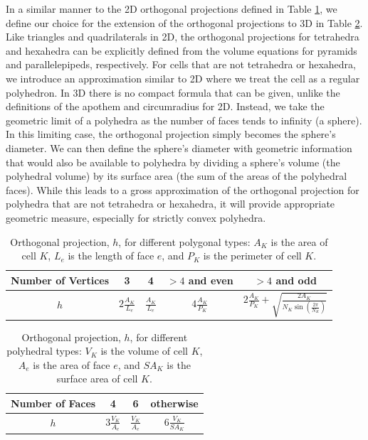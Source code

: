  In a similar manner to the 2D orthogonal projections defined in Table \ref{tab::orth_proj_2D}, we define our choice for the extension of the orthogonal projections to 3D in Table \ref{tab::orth_proj_3D}. Like triangles and quadrilaterals in 2D, the orthogonal projections for tetrahedra and hexahedra can be explicitly defined from the volume equations for pyramids and parallelepipeds, respectively. For cells that are not tetrahedra or hexahedra, we introduce an approximation similar to 2D where we treat the cell as a regular polyhedron. In 3D there is no compact formula that can be given, unlike the definitions of the apothem and circumradius for 2D. Instead, we take the geometric limit of a polyhedra as the number of faces tends to infinity (a sphere). In this limiting case, the orthogonal projection simply becomes the sphere's diameter. We can then define the sphere's diameter with geometric information that would also be available to polyhedra by dividing a sphere's volume (the polyhedral volume) by its surface area (the sum of the areas of the polyhedral faces). While this leads to a gross approximation of the orthogonal projection for polyhedra that are not tetrahedra or hexahedra, it will provide appropriate geometric measure, especially for strictly convex polyhedra.

\begin{table}[h]
\centering
\caption{Orthogonal projection, $h$, for different polygonal types: $A_K$ is the area of cell $K$, $L_e$ is the length of face $e$, and $P_K$ is the perimeter of cell $K$.}
\def\arraystretch{1.4}
\begin{tabular}{|c|c|c|c|c|}
	\hline
	Number of Vertices & 3 & 4 & $>4$ and even& $>4$ and odd \\
	\hline
	$h$ & $2 \frac{A_K}{L_e}$ & $\frac{A_K}{L_e}$ & $4 \frac{A_K}{P_K}$ & $2 \frac{A_K}{P_K} + \sqrt{\frac{2 A_K}{N_K \sin(\frac{2 \pi}{N_K})}}$ \\
	\hline
\end{tabular}
\label{tab::orth_proj_2D}
\end{table}



\begin{table}[h]
\centering
\caption{Orthogonal projection, $h$, for different polyhedral types: $V_K$ is the volume of cell $K$, $A_e$ is the area of face $e$, and $SA_K$ is the surface area of cell $K$.}
\def\arraystretch{1.4}
\begin{tabular}{|c|c|c|c|}
	\hline
	Number of Faces & 4 & 6 & otherwise \\
	\hline
	$h$ & $3 \frac{V_K}{A_e}$ & $\frac{V_K}{A_e}$ & $6 \frac{V_K}{SA_K}$  \\ [1ex]
	\hline
\end{tabular}
\label{tab::orth_proj_3D}
\end{table}

